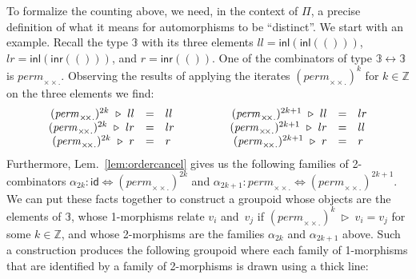 \documentclass[a4paper,USenglish]{lipics-v2016-utf8x}
\newcommand{\iso}{\leftrightarrow}
\newcommand{\isotwo}{\Leftrightarrow}
\newcommand{\inl}[1]{\textsf{inl}(#1)}
\newcommand{\inr}[1]{\textsf{inr}(#1)}
\newcommand{\Z}{\mathbb{Z}}
\newcommand{\permtwo}{\mathit{perm}_{\times\!\times.}}
\newcommand{\evalone}[2]{#1~\triangleright~#2}
\newcommand{\unitv}{()}
\newcommand{\idiso}{\mathsf{{id}}}
\begin{document}
To formalize the counting above, we need, in the context of $\Pi$, a precise
definition of what it means for automorphisms to be ``distinct''. We start with
an example. Recall the type $\mathbb{3}$ with its three elements
$ll=\inl{\inl{\unitv}}$, $lr=\inl{\inr{\unitv}}$, and $r=\inr{\unitv}$. One of
the combinators of type $\mathbb{3} \iso \mathbb{3}$ is $\permtwo$. Observing
the results of applying the iterates $(\permtwo)^k$ for $k \in \Z$ on the three
elements we find:
\[\begin{array}{c@{\qquad\qquad}c}
\begin{array}{rcl}
\evalone{(\permtwo)^{2k}}{ll} &=& ll \\
\evalone{(\permtwo)^{2k}}{lr} &=& lr \\
\evalone{(\permtwo)^{2k}}{r} &=& r
\end{array} &
\begin{array}{rcl}
\evalone{(\permtwo)^{2k+1}}{ll} &=& lr \\
\evalone{(\permtwo)^{2k+1}}{lr} &=& ll \\
\evalone{(\permtwo)^{2k+1}}{r} &=& r
\end{array}
\end{array}\]
Furthermore, Lem.~\ref{lem:ordercancel} gives us the following families of
2-combinators $\alpha_{2k} : \idiso \isotwo (\permtwo)^{2k}$ and
$\alpha_{2k+1} : \permtwo \isotwo (\permtwo)^{2k+1}$. We can put these facts together to
construct a groupoid whose objects are the elements of $\mathbb{3}$, whose
1-morphisms relate $v_i$ and~$v_j$ if $\evalone{(\permtwo)^k}{v_i} = v_j$ for some
$k \in \Z$, and whose 2-morphisms are the families $\alpha_{2k}$ and
$\alpha_{2k+1}$ above. Such a construction produces the following groupoid where
each family of 1-morphisms that are identified by a family of 2-morphisms is
drawn using a thick line:

\begin{center}
\end{center}
\end{document}
